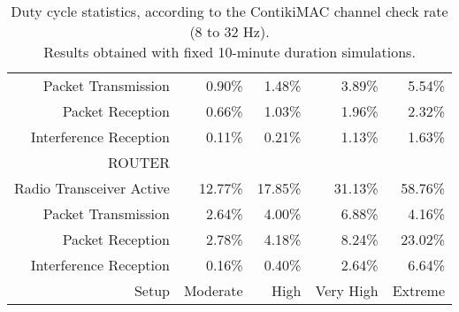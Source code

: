 \documentclass[a4paper,twoside]{article}
\begin{document}
\begin{subtables}
\begin{table*}[htbp]
\begin{tabular}{|r|r|r|r|r|}
Packet Transmission & 0.90\% & 1.48\% & 3.89\% & 5.54\% \\
Packet Reception & 0.66\% & 1.03\% & 1.96\% & 2.32\% \\
Interference Reception & 0.11\% & 0.21\% & 1.13\% & 1.63\% \\
ROUTER & & & & \\
Radio Transceiver Active & 12.77\% & 17.85\% & 31.13\% & 58.76\% \\
Packet Transmission & 2.64\% & 4.00\% & 6.88\% & 4.16\% \\
Packet Reception & 2.78\% & 4.18\% & 8.24\% & 23.02\% \\
Interference Reception & 0.16\% & 0.40\% & 2.64\% & 6.64\% \\
\hline
Setup & Moderate & High & Very High & Extreme \\
\hline
\end{tabular}
\caption{Duty cycle statistics, according to the ContikiMAC channel
         check rate (8 to 32 Hz).\\
         Results obtained with fixed 10-minute duration simulations.}
\label{TblDutyCycleStatsA}
\end{table*}


\end{subtables}
\end{document}
